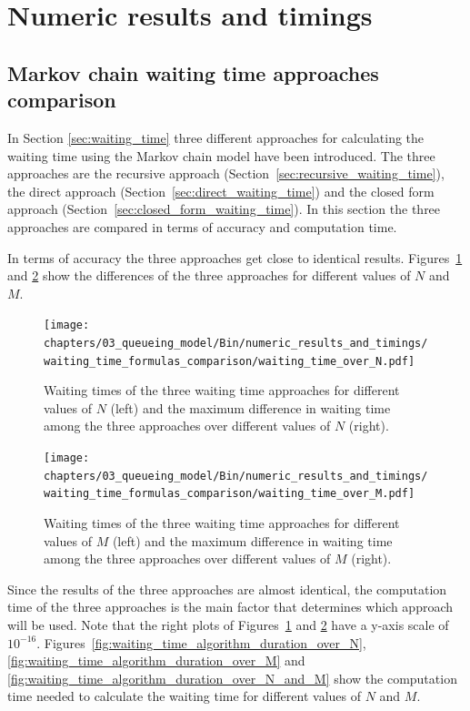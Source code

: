 \section{Numeric results and timings}\label{sec:numeric_results_and_timings}


\subsection{Markov chain waiting time approaches comparison}
\label{sec:waiting_time_approach_comparison}

In Section \ref{sec:waiting_time} three different approaches for calculating
the waiting time using the Markov chain model have been introduced.
The three approaches are the recursive approach
(Section~\ref{sec:recursive_waiting_time}), the direct approach
(Section~\ref{sec:direct_waiting_time}) and the closed form
approach (Section~\ref{sec:closed_form_waiting_time}).
In this section the three approaches are compared in terms of accuracy and
computation time.

In terms of accuracy the three approaches get close to identical results.
Figures~\ref{fig:waiting_time_accuracy_over_N} and
\ref{fig:waiting_time_accuracy_over_M} show the differences of the three
approaches for different values of \(N\) and \(M\).


\begin{figure}[H]
    \texttt{[image: chapters/03\_queueing\_model/Bin/numeric\_results\_and\_timings/waiting\_time\_formulas\_comparison/waiting\_time\_over\_N.pdf]}
    \caption{
        Waiting times of the three waiting time approaches for different
        values of \(N\) (left) and the maximum difference in waiting time among
        the three approaches over different values of \(N\) (right).
    }
    \label{fig:waiting_time_accuracy_over_N}
\end{figure}

\begin{figure}[H]
    \texttt{[image: chapters/03\_queueing\_model/Bin/numeric\_results\_and\_timings/waiting\_time\_formulas\_comparison/waiting\_time\_over\_M.pdf]}
    \caption{Waiting times of the three waiting time approaches for different
    values of \(M\) (left) and the maximum difference in waiting time among
    the three approaches over different values of \(M\) (right).}
    \label{fig:waiting_time_accuracy_over_M}
\end{figure}


Since the results of the three approaches are almost identical, the computation
time of the three approaches is the main factor that determines which
approach will be used.
Note that the right plots of Figures~\ref{fig:waiting_time_accuracy_over_N} and
\ref{fig:waiting_time_accuracy_over_M} have a y-axis scale of \(10^{-16}\).
Figures~\ref{fig:waiting_time_algorithm_duration_over_N},
\ref{fig:waiting_time_algorithm_duration_over_M} and
\ref{fig:waiting_time_algorithm_duration_over_N_and_M} show the computation
time needed to calculate the waiting time for different values of \(N\) and
\(M\).

